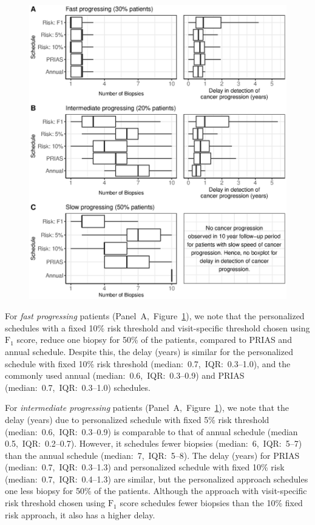 \documentclass[Afour,sagev,times]{sagej}
\begin{document}
\begin{figure}[!htb]
\captionsetup{justification=justified}
\centerline{\includegraphics[width=\columnwidth]{Figure6.eps}}

\label{Figure6}
\end{figure}

For \textit{fast progressing} patients (Panel~A,~Figure~\ref{Figure6}), we note that the personalized schedules with a fixed 10\% risk threshold and visit-specific threshold chosen using $\mbox{F}_1$ score, reduce one biopsy for 50\% of the patients, compared to PRIAS and annual schedule. Despite this, the delay (years) is similar for the personalized schedule with fixed 10\% risk threshold (median:~0.7,~IQR:~0.3--1.0), and the commonly used annual (median:~0.6,~IQR:~0.3--0.9) and PRIAS (median:~0.7,~IQR:~0.3--1.0) schedules.

For \textit{intermediate progressing} patients (Panel~A,~Figure~\ref{Figure6}), we note that the delay (years) due to personalized schedule with fixed 5\% risk threshold (median:~0.6,~IQR:~0.3--0.9) is comparable to that of annual schedule (median 0.5,~IQR:~0.2--0.7). However, it schedules fewer biopsies (median:~6,~IQR:~5--7) than the annual schedule (median:~7,~IQR:~5--8). The delay (years) for PRIAS (median:~0.7,~IQR:~0.3--1.3) and personalized schedule with fixed 10\% risk (median:~0.7,~IQR:~0.4--1.3) are similar, but the personalized approach schedules one less biopsy for 50\% of the patients. Although the approach with visit-specific risk threshold chosen using $\mbox{F}_1$ score schedules fewer biopsies than the 10\% fixed risk approach, it also has a higher delay.
\end{document}
